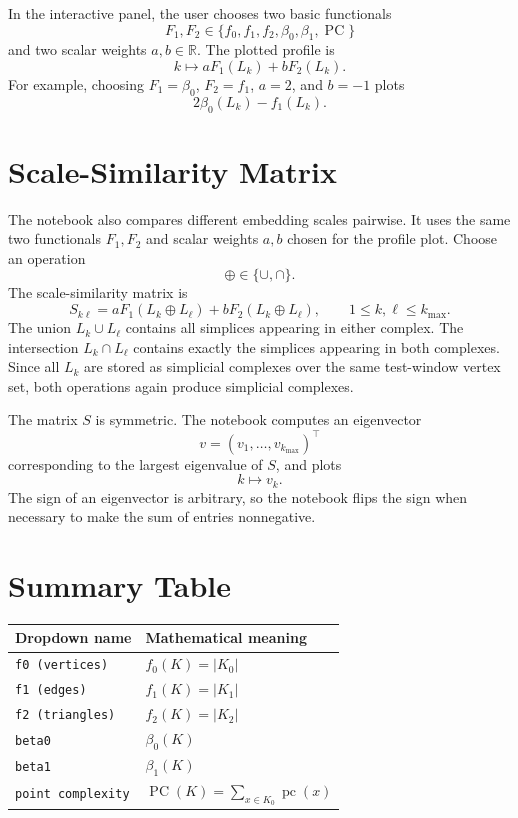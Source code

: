 \documentclass[11pt]{article}
\begin{document}
In the interactive panel, the user chooses two basic functionals
\[
  F_1,F_2\in
  \{f_0,f_1,f_2,\beta_0,\beta_1,\operatorname{PC}\}
\]
and two scalar weights \(a,b\in\mathbb{R}\). The plotted profile is
\[
  k\longmapsto aF_1(L_k)+bF_2(L_k).
\]
For example, choosing \(F_1=\beta_0\), \(F_2=f_1\), \(a=2\), and \(b=-1\)
plots
\[
  2\beta_0(L_k)-f_1(L_k).
\]

\section{Scale-Similarity Matrix}

The notebook also compares different embedding scales pairwise. It uses the
same two functionals \(F_1,F_2\) and scalar weights \(a,b\) chosen for the
profile plot. Choose an operation
\[
  \oplus\in\{\cup,\cap\}.
\]
The scale-similarity matrix is
\[
  S_{k\ell}
  =
  aF_1(L_k\oplus L_\ell)+bF_2(L_k\oplus L_\ell),
  \qquad 1\leq k,\ell\leq k_{\max}.
\]
The union \(L_k\cup L_\ell\) contains all simplices appearing in either
complex. The intersection \(L_k\cap L_\ell\) contains exactly the simplices
appearing in both complexes. Since all \(L_k\) are stored as simplicial
complexes over the same test-window vertex set, both operations again produce
simplicial complexes.

The matrix \(S\) is symmetric. The notebook computes an eigenvector
\[
  v=(v_1,\ldots,v_{k_{\max}})^\top
\]
corresponding to the largest eigenvalue of \(S\), and plots
\[
  k\longmapsto v_k.
\]
The sign of an eigenvector is arbitrary, so the notebook flips the sign when
necessary to make the sum of entries nonnegative.

\section{Summary Table}

\begin{center}
\begin{tabular}{@{}ll@{}}
\toprule
Dropdown name & Mathematical meaning \\
\midrule
\texttt{f0 (vertices)} & \(f_0(K)=|K_0|\) \\
\texttt{f1 (edges)} & \(f_1(K)=|K_1|\) \\
\texttt{f2 (triangles)} & \(f_2(K)=|K_2|\) \\
\texttt{beta0} & \(\beta_0(K)\) \\
\texttt{beta1} & \(\beta_1(K)\) \\
\texttt{point complexity} & \(\operatorname{PC}(K)=\sum_{x\in K_0}\operatorname{pc}(x)\) \\
\bottomrule
\end{tabular}
\end{center}
\end{document}
